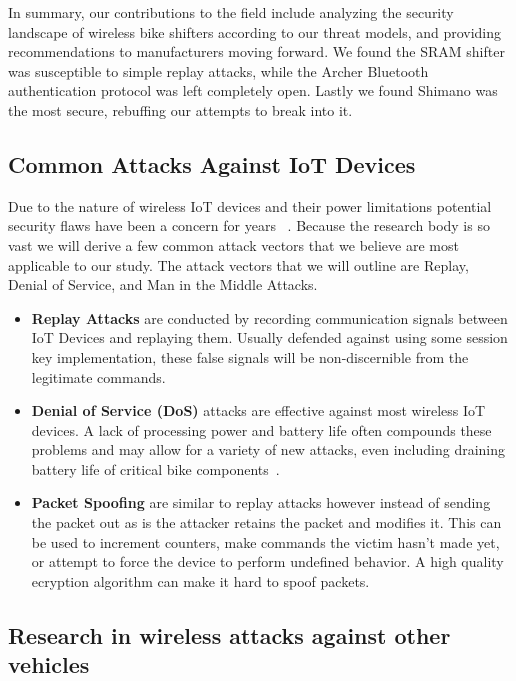 \documentclass[letterpaper,twocolumn,10pt]{article}
\begin{document}
In summary, our contributions to the field include analyzing the security landscape of wireless bike shifters according to our threat models, and providing recommendations to manufacturers moving forward. We found the SRAM shifter was susceptible to simple replay attacks, while the Archer Bluetooth authentication protocol was left completely open. Lastly we found Shimano was the most secure, rebuffing our attempts to break into it.

\subsection{Common Attacks Against IoT Devices}

Due to the nature of wireless IoT devices and their power limitations potential security flaws have been a concern for years~ \cite{HeXu}. Because the research body is so vast we will derive a few common attack vectors that we believe are most applicable to our study. The attack vectors that we will outline are Replay, Denial of Service, and Man in the Middle Attacks.

\begin{itemize}
  \item \textbf{Replay Attacks} are conducted by recording communication signals between IoT Devices and replaying them. Usually defended against using some session key implementation, these false signals will be non-discernible from the legitimate commands.
  \item \textbf{Denial of Service (DoS)} attacks are effective against most wireless IoT devices. A lack of processing power and battery life often compounds these problems and may allow for a variety of new attacks, even including draining battery life of critical bike components~\cite{Moyers}.
  \item \textbf{Packet Spoofing} are similar to replay attacks however instead of sending the packet out as is the attacker retains the packet and modifies it. This can be used to increment counters, make commands the victim hasn't made yet, or attempt to force the device to perform undefined behavior. A high quality ecryption algorithm can make it hard to spoof packets.
\end{itemize}

\subsection{Research in wireless attacks against other vehicles}
\end{document}
